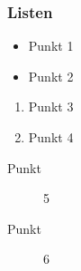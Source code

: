 \begin{frame}
\frametitle{Listen}

\begin{itemize}
\item Punkt 1
\item Punkt 2
\end{itemize}

\begin{enumerate}
\item Punkt 3
\item Punkt 4
\end{enumerate}

\begin{description}
\item[Punkt] 5
\item[Punkt] 6
\end{description}
\end{frame}
